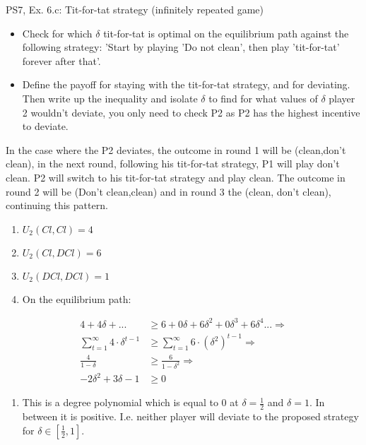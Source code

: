 \begin{frame}{PS7, Ex. 6.c: Tit-for-tat strategy (infinitely repeated game)}
    \begin{itemize}
    \item[(c)] Check for which $\delta$ tit-for-tat is optimal on the equilibrium path against the following strategy: ’Start by playing ’Do not clean’, then play ’tit-for-tat’ forever after that’.
    \end{itemize}
    \vspace{-8pt}
  \begin{multicols}{2}
  \begin{itemize}
      \item[(Step a)] Define the payoff for staying with the tit-for-tat strategy, and for deviating. Then write up the inequality and isolate $\delta$ to find for what values of $\delta$ player 2 wouldn't deviate, you only need to check P2 as P2 has the highest incentive to deviate.
  \end{itemize}
  In the case where the P2 deviates, the outcome in round 1 will be (clean,don't clean), in the next round, following his tit-for-tat strategy, P1 will play don't clean. P2 will switch to his tit-for-tat strategy and play clean. The outcome in round 2 will be (Don't clean,clean) and in round 3 the (clean, don't clean), continuing this pattern.
    \vfill\null\columnbreak
    \begin{enumerate}
        \item $U_2(Cl,Cl) = 4$
        \item $U_2(Cl,DCl) = 6$
        \item $U_2(DCl,DCl) = 1$
        \item On the equilibrium path:
    \end{enumerate}
    \vspace{-10pt}
    \begin{align*}
          4+4\delta+...&\geq6+0\delta+6\delta^2+0\delta^3+6\delta^4...\Rightarrow\\
          \sum_{t=1}^{\infty} 4\cdot\delta^{t-1} &\geq \sum_{t=1}^{\infty} 6\cdot(\delta^2)^{t-1}\Rightarrow\\
          \frac{4}{1-\delta} &\geq \frac{6}{1-\delta^2}\Rightarrow\\
          -2\delta^2 + 3\delta - 1 &\geq 0
    \end{align*}
    \vspace{-20pt}
    \begin{enumerate}
        \item This is a  degree polynomial which is equal to 0 at $\delta=\frac{1}{2}$ and $\delta=1$. In between it is positive. I.e. neither player will deviate to the proposed strategy for $\delta\in\left[\frac{1}{2},1\right]$.
    \end{enumerate}
    \vfill\null
  \end{multicols}
\end{frame}

